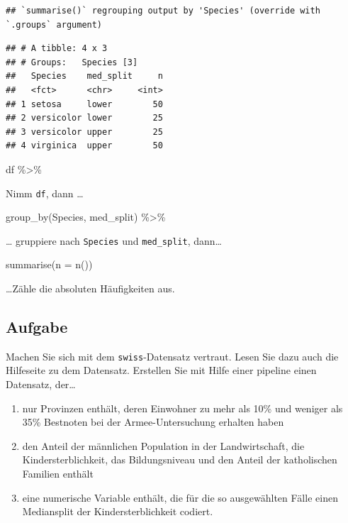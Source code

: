 \documentclass[
]{book}
\newenvironment{Shaded}{\begin{snugshade}}{\end{snugshade}}
\newcommand{\AttributeTok}[1]{\textcolor[rgb]{0.77,0.63,0.00}{#1}}
\newcommand{\FunctionTok}[1]{\textcolor[rgb]{0.00,0.00,0.00}{#1}}
\newcommand{\NormalTok}[1]{#1}
\newcommand{\SpecialCharTok}[1]{\textcolor[rgb]{0.00,0.00,0.00}{#1}}
\begin{document}
\begin{verbatim}
## `summarise()` regrouping output by 'Species' (override with `.groups` argument)
\end{verbatim}

\begin{verbatim}
## # A tibble: 4 x 3
## # Groups:   Species [3]
##   Species    med_split     n
##   <fct>      <chr>     <int>
## 1 setosa     lower        50
## 2 versicolor lower        25
## 3 versicolor upper        25
## 4 virginica  upper        50
\end{verbatim}

\begin{Shaded}
\begin{Highlighting}[]
\NormalTok{df }\SpecialCharTok{\%\textgreater{}\%} 
\end{Highlighting}
\end{Shaded}

Nimm \texttt{df}, dann \ldots{}

\begin{Shaded}
\begin{Highlighting}[]
  \FunctionTok{group\_by}\NormalTok{(Species, med\_split) }\SpecialCharTok{\%\textgreater{}\%} 
\end{Highlighting}
\end{Shaded}

\ldots{} gruppiere nach \texttt{Species} und \texttt{med\_split}, dann\ldots{}

\begin{Shaded}
\begin{Highlighting}[]
  \FunctionTok{summarise}\NormalTok{(}\AttributeTok{n =} \FunctionTok{n}\NormalTok{()) }
\end{Highlighting}
\end{Shaded}

\ldots Zähle die absoluten Häufigkeiten aus.

\hypertarget{aufgabe}{%
\subsection{Aufgabe}\label{aufgabe}}

Machen Sie sich mit dem \texttt{swiss}-Datensatz vertraut. Lesen Sie dazu auch die Hilfeseite zu dem Datensatz.
Erstellen Sie mit Hilfe einer pipeline einen Datensatz, der\ldots{}

\begin{enumerate}
\def\labelenumi{\arabic{enumi}.}
\item
  nur Provinzen enthält, deren Einwohner zu mehr als 10\% und weniger als 35\% Bestnoten bei der Armee-Untersuchung erhalten haben
\item
  den Anteil der männlichen Population in der Landwirtschaft, die Kindersterblichkeit, das Bildungsniveau und den Anteil der katholischen Familien enthält
\item
  eine numerische Variable enthält, die für die so ausgewählten Fälle einen Mediansplit der Kindersterblichkeit codiert.
\end{enumerate}
\end{document}
